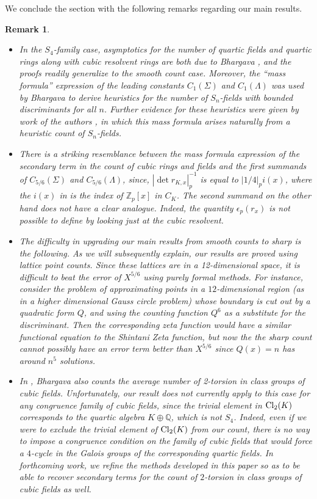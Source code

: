 \documentclass{article}
\def\Z{{\mathbb Z}}
\def\Cl{{\rm Cl}}
\def\Q{{\mathbb Q}}
\def\Z{{\mathbb Z}}
\def\Q{{\mathbb Q}}
\newtheorem{Remark}[Theorem]{Remark}
\begin{document}
\noindent We conclude the section with the following remarks regarding our main results.
\begin{Remark}{\rm 
\begin{itemize}
\item[{\rm (a)}] In the $S_4$-family case, asymptotics for the number of quartic fields and quartic rings along with cubic resolvent rings are both due to Bhargava \cite{dodpf}, and the proofs readily generalize to the smooth count case. Moreover, the ``mass formula'' expression of the leading constants $C_1(\Sigma)$ and $C_1(\Lambda)$ was used by Bhargava \cite{bhargava_mass} to derive heuristics for the number of $S_n$-fields with bounded discriminants for all $n$. Further evidence for these heuristics were given by work of the authors \cite{ST_heuristics}, in which this mass formula arises naturally from a heuristic count of $S_n$-fields.
\item[{\rm (b)}] There is a striking resemblance between the mass formula expression of the secondary term in the count of cubic rings and fields \cite[Theorem 7]{BST} and the first summands of $C_{5/6}(\Sigma)$ and $C_{5/6}(\Lambda)$, since, $|\det r_{K,x}|_p^{-1}$ is equal to $|1/4|_p i(x)$, where the $i(x)$ in \cite[Theorem 7]{BST} is the index of $\Z_p[x]$ in $C_K$. The second summand on the other hand does not have a clear analogue. Indeed, the quantity $\epsilon_p(r_x)$ is not possible to define by looking just at the cubic resolvent.
\item[{\rm (c)}] The difficulty in upgrading our main results from smooth counts to sharp is the following. As we will subsequently explain, our results are proved using lattice point counts. Since these lattices are in a 12-dimensional space, it is difficult to beat the error of $X^{5/6}$ using purely formal methods. For instance, consider the problem of approximating points in a $12$-dimensional region (as in a higher dimensional Gauss circle problem) whose boundary is cut out by a quadratic form $Q$,  and using the counting function $Q^{6}$ as a substitute for the discriminant. Then the corresponding zeta function would have a similar functional equation to the Shintani Zeta function, but now the the sharp count cannot possibly have an error term better than $X^{5/6}$ since $Q(x)=n$ has around $n^5$ solutions. 
\item[{\rm (d)}] In \cite{dodpf}, Bhargava also counts the average number of 2-torsion in class groups of cubic fields. Unfortunately, our result does not currently apply to this case for {\it any} congruence family of cubic fields, since the trivial element in $\Cl_2(K)$ corresponds to the quartic algebra $K\oplus\Q$, which is not $S_4$.
Indeed, even if we were to exclude the trivial element of $\Cl_2(K)$ from our count, there is no way to impose a congruence condition on the family of cubic fields that would force a $4$-cycle in the Galois groups of the corresponding quartic fields. In forthcoming work, we refine the methods developed in this paper so as to be able to recover secondary terms for the count of $2$-torsion in class groups of cubic fields as well.
\end{itemize}
   
}\end{Remark}
\end{document}
